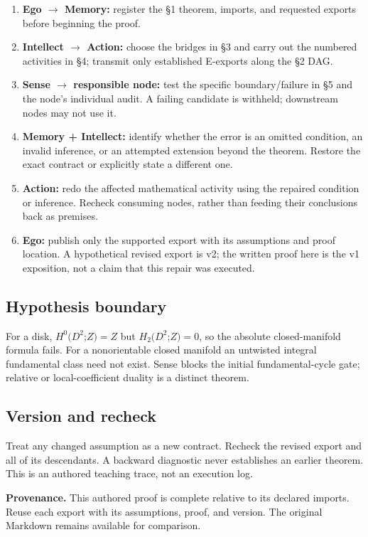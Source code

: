 \documentclass[preprint,12pt,aps,pra,showkeys,amsmath,amssymb,superscriptaddress,floatfix]{revtex4-2}
\theoremstyle{definition}
\theoremstyle{remark}
\providecommand{\tightlist}{\setlength{\itemsep}{2pt}\setlength{\parskip}{0pt}}
\begin{document}
\begin{enumerate}
\def\labelenumi{\arabic{enumi}.}
\tightlist
\item
  \textbf{Ego \(\to\) Memory:} register the §1 theorem, imports, and
  requested exports before beginning the proof.
\item
  \textbf{Intellect \(\to\) Action:} choose the bridges in §3 and carry
  out the numbered activities in §4; transmit only established E-exports
  along the §2 DAG.
\item
  \textbf{Sense \(\to\) responsible node:} test the specific
  boundary/failure in §5 and the node's individual audit. A failing
  candidate is withheld; downstream nodes may not use it.
\item
  \textbf{Memory + Intellect:} identify whether the error is an omitted
  condition, an invalid inference, or an attempted extension beyond the
  theorem. Restore the exact contract or explicitly state a different
  one.
\item
  \textbf{Action:} redo the affected mathematical activity using the
  repaired condition or inference. Recheck consuming nodes, rather than
  feeding their conclusions back as premises.
\item
  \textbf{Ego:} publish only the supported export with its assumptions
  and proof location. A hypothetical revised export is v2; the written
  proof here is the v1 exposition, not a claim that this repair was
  executed.
\end{enumerate}

\subsection{Hypothesis boundary}
For a disk, \(H^{0}(D^{2}\);\(Z)=Z\) but \(H_{2}(D^{2}\);\(Z)=0\), so
the absolute closed-manifold formula fails. For a nonorientable closed
manifold an untwisted integral fundamental class need not exist. Sense
blocks the initial fundamental-cycle gate; relative or local-coefficient
duality is a distinct theorem.

\subsection{Version and recheck}
Treat any changed assumption as a new contract. Recheck the revised
export and all of its descendants. A backward diagnostic never
establishes an earlier theorem. This is an authored teaching trace, not
an execution log.

\par\medskip\begingroup\small\linespread{1.0}\selectfont\noindent\textbf{Provenance.} This authored proof is complete relative to its declared imports. Reuse
each export with its assumptions, proof, and version. The original
Markdown remains available for comparison.
\par\endgroup
\end{document}
